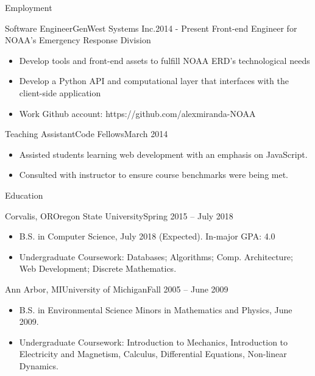 \documentclass[]{mcdowellcv}
\begin{document}
	\makeheader
	
	\begin{cvsection}{Employment}
		\begin{cvsubsection}{Software Engineer}{GenWest Systems Inc.}{2014 - Present}
			Front-end Engineer for NOAA's Emergency Response Division			
			\begin{itemize}
				\item Develop tools and front-end assets to fulfill NOAA ERD's technological needs 
				\item Develop a Python API and computational layer that interfaces with the client-side application
				\item Work Github account: https://github.com/alexmiranda-NOAA
			\end{itemize}
		\end{cvsubsection}
		
		\begin{cvsubsection}{Teaching Assistant}{Code Fellows}{March 2014}	
			\begin{itemize}
				\item Assisted students learning web development with an emphasis on JavaScript.
				\item Consulted with instructor to ensure course benchmarks were being met.
			\end{itemize}
		\end{cvsubsection}
	\end{cvsection}
	
	\begin{cvsection}{Education}
		\begin{cvsubsection}{Corvalis, OR}{Oregon State University}{Spring 2015 -- July 2018}
			\begin{itemize}
        \item B.S. in Computer Science, July 2018 (Expected).  In-major GPA: 4.0
				\item Undergraduate Coursework: Databases; Algorithms; Comp. Architecture; Web Development; Discrete Mathematics.
			\end{itemize}
		\end{cvsubsection}
    \begin{cvsubsection}{Ann Arbor, MI}{University of Michigan}{Fall 2005 -- June 2009}
      \begin{itemize}
        \item B.S. in Environmental Science Minors in Mathematics and Physics, June 2009. 
        \item Undergraduate Coursework: Introduction to Mechanics, Introduction to Electricity and Magnetism, Calculus, Differential Equations, Non-linear Dynamics.
      \end{itemize}
    \end{cvsubsection}
	\end{cvsection}
	
\end{document}
